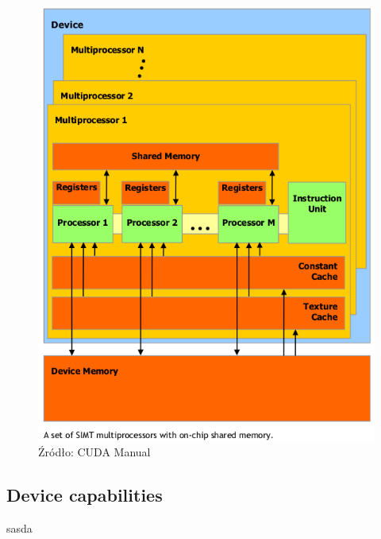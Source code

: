 \begin{figure}[ht]
\centering
\includegraphics[scale=0.8]{images/gpu.png}
\caption{Źródło: CUDA Manual}
\end{figure}

\subsection{Device capabilities}
sasda
